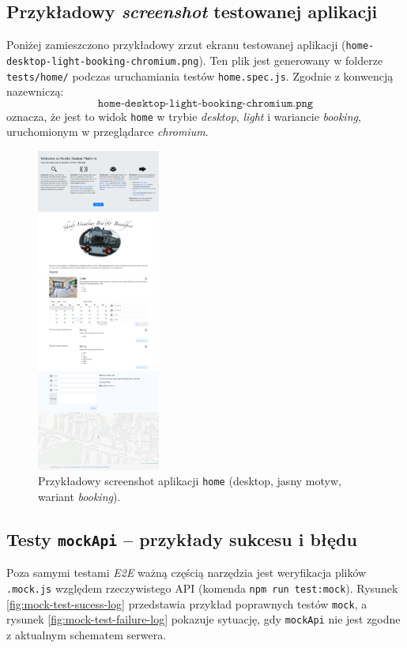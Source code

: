 \documentclass[12pt]{report}
\begin{document}
\subsection*{Przykładowy \emph{screenshot} testowanej aplikacji}

Poniżej zamieszczono przykładowy zrzut ekranu testowanej aplikacji (\texttt{home-desktop-light-booking-chromium.png}). Ten plik jest generowany w folderze \texttt{tests/home/} podczas uruchamiania testów \texttt{home.spec.js}. Zgodnie z konwencją nazewniczą:
\[
 \texttt{home-desktop-light-booking-chromium.png}
\]
oznacza, że jest to widok \texttt{home} w trybie \emph{desktop}, \emph{light} i wariancie \emph{booking}, uruchomionym w przeglądarce \emph{chromium}.

\begin{figure}[H]
\centering
\includegraphics[width=0.36\textwidth]{home-desktop-light-booking-chromium.png}
\caption{Przykładowy screenshot aplikacji \texttt{home} (desktop, jasny motyw, wariant \emph{booking}).}
\label{fig:home-desktop-light-booking}
\end{figure}

\subsection*{Testy \texttt{mockApi} – przykłady sukcesu i błędu}

Poza samymi testami \emph{E2E} ważną częścią narzędzia jest weryfikacja plików \texttt{.mock.js} względem rzeczywistego API (komenda \texttt{npm run test:mock}). Rysunek \ref{fig:mock-test-sucess-log} przedstawia przykład poprawnych testów \texttt{mock}, a rysunek \ref{fig:mock-test-failure-log} pokazuje sytuację, gdy \texttt{mockApi} nie jest zgodne z aktualnym schematem serwera.
\end{document}
